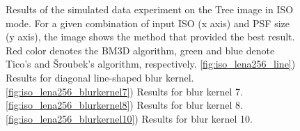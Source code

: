 \documentclass[12pt,notitlepage]{report}
\begin{document}
\begin{figure}[t]
  \caption[Simulated-data experiment on the Tree image in ISO mode]{Results of the simulated data experiment on the Tree image in ISO mode. For a given combination of input ISO (x axis) and PSF size (y axis), the image shows the method that provided the best result. Red color denotes the BM3D algorithm, green and blue denote Tico's and Šroubek's algorithm, respectively. \ref{fig:iso_lena256_line}) Results for diagonal line-shaped blur kernel. \ref{fig:iso_lena256_blurkernel7}) Results for blur kernel 7. \ref{fig:iso_lena256_blurkernel8}) Results for blur kernel 8. \ref{fig:iso_lena256_blurkernel10}) Results for blur kernel 10.}
  \label{fig:iso_tree256}
\end{figure}

\clearpage
\end{document}
